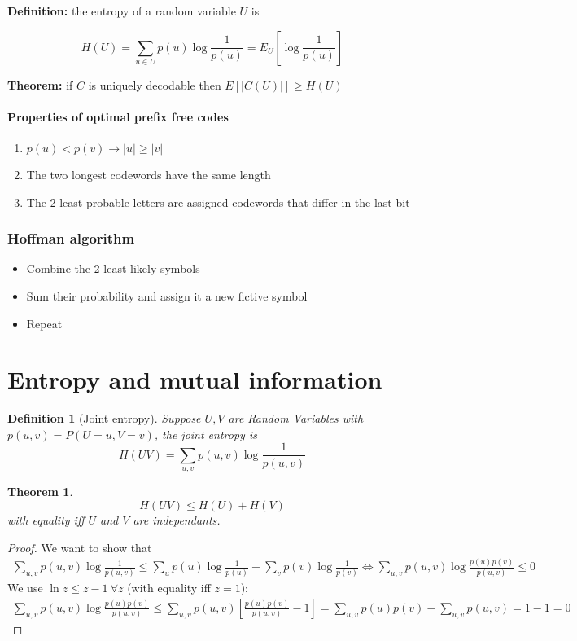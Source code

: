 \documentclass{article}
\newtheorem{theorem}{Theorem}[section]
\newtheorem{definition}{Definition}[section]
\begin{document}
\textbf{Definition:} the entropy of a random variable $U$ is

\[H(U) = \sum_{u\in U} p(u) \log \frac 1 {p(u)} = E_U\left[\log \frac 1 {p(u)}\right]\]

\textbf{Theorem:} if $C$ is uniquely decodable then
$E[|C(U)|] \geq H(U)$

\paragraph{Properties of optimal prefix free
codes}\label{properties-of-optimal-prefix-free-codes}

\begin{enumerate}
\item
  $p(u) < p(v) \to |u| \geq |v|$
\item
  The two longest codewords have the same length
\item
  The 2 least probable letters are assigned codewords that differ in the
  last bit
\end{enumerate}

\subsubsection{Hoffman algorithm}\label{hoffman-algorithm}

\begin{itemize}
\item
  Combine the 2 least likely symbols
\item
  Sum their probability and assign it a new fictive symbol
\item
  Repeat
\end{itemize}

\section{Entropy and mutual information}
\label{sec:entropy}

\begin{definition}[Joint entropy]
  Suppose $U, V$ are Random Variables with $p(u,v) = P(U=u, V=v)$, the joint entropy is
  \[
    H(UV) = \sum_{u,v} p(u,v) \log \frac 1 {p(u,v)}
  \]
\end{definition}

\begin{theorem}
  \[
    H(UV) \leq H(U) + H(V)
  \]
  with equality iff $U$ and $V$ are independants.
\end{theorem}

\begin{proof}
  We want to show that
  \begin{align*}
    \sum_{u,v} p(u,v) \log \frac 1 {p(u,v)} \leq \sum_u p(u) \log \frac 1 {p(u)} + \sum_v p(v) \log \frac 1 {p(v)}
    \iff \sum_{u,v} p(u,v) \log \frac {p(u)p(v)} {p(u,v)} \leq 0
  \end{align*}
  We use $\ln z \leq z - 1~\forall z$ (with equality iff $z=1$):
  \begin{align*}
    \sum_{u,v} p(u,v) \log \frac {p(u)p(v)} {p(u,v)} \leq \sum_{u,v} p(u,v) \left[ \frac {p(u)p(v)} {p(u, v)} - 1 \right] = \sum_{u,v} p(u)p(v) - \sum_{u,v} p(u,v) = 1 - 1 = 0
  \end{align*}
\end{proof}
\end{document}

